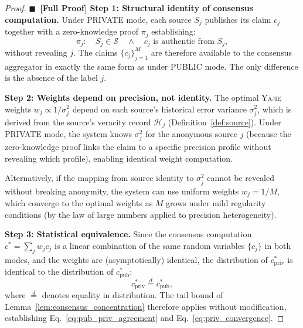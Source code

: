 \documentclass[11pt,a4paper]{article}
\theoremstyle{definition}
\newcommand{\rigorFull}[0]{$\blacksquare$~\textbf{[Full Proof]}}
\newcommand{\Yajie}{\textsc{Yajie}}
\newcommand{\sourceSet}{\mathcal{S}}
\newcommand{\VISpublic}{\textsc{PUBLIC}}
\newcommand{\VISprivate}{\textsc{PRIVATE}}
\begin{document}
\begin{proof}\rigorFull
\textbf{Step 1: Structural identity of consensus computation.} Under \VISprivate{} mode, each source $S_j$ publishes its claim $c_j$ together with a zero-knowledge proof $\pi_j$ establishing:
\begin{equation}
    \pi_j: \quad S_j \in \sourceSet \quad \land \quad c_j \text{ is authentic from } S_j,
    \label{eq:zk_proof}
\end{equation}
without revealing $j$. The claims $\{c_j\}_{j=1}^{M}$ are therefore available to the consensus aggregator in exactly the same form as under \VISpublic{} mode. The only difference is the absence of the label $j$.

\textbf{Step 2: Weights depend on precision, not identity.} The optimal \Yajie{} weights $w_j \propto 1/\sigma_j^2$ depend on each source's historical error variance $\sigma_j^2$, which is derived from the source's veracity record $\mathcal{H}_j$ (Definition~\ref{def:source}). Under \VISprivate{} mode, the system knows $\sigma_j^2$ for the anonymous source $j$ (because the zero-knowledge proof links the claim to a specific precision profile without revealing which profile), enabling identical weight computation.

Alternatively, if the mapping from source identity to $\sigma_j^2$ cannot be revealed without breaking anonymity, the system can use uniform weights $w_j = 1/M$, which converge to the optimal weights as $M$ grows under mild regularity conditions (by the law of large numbers applied to precision heterogeneity).

\textbf{Step 3: Statistical equivalence.} Since the consensus computation $c^* = \sum_j w_j c_j$ is a linear combination of the same random variables $\{c_j\}$ in both modes, and the weights are (asymptotically) identical, the distribution of $c^*_{\mathrm{priv}}$ is identical to the distribution of $c^*_{\mathrm{pub}}$:
\begin{equation}
    c^*_{\mathrm{priv}} \overset{d}{=} c^*_{\mathrm{pub}},
    \label{eq:distributional_equality}
\end{equation}
where $\overset{d}{=}$ denotes equality in distribution. The tail bound of Lemma~\ref{lem:consensus_concentration} therefore applies without modification, establishing Eq.~\eqref{eq:pub_priv_agreement} and Eq.~\eqref{eq:priv_convergence}.


\end{proof}
\end{document}
